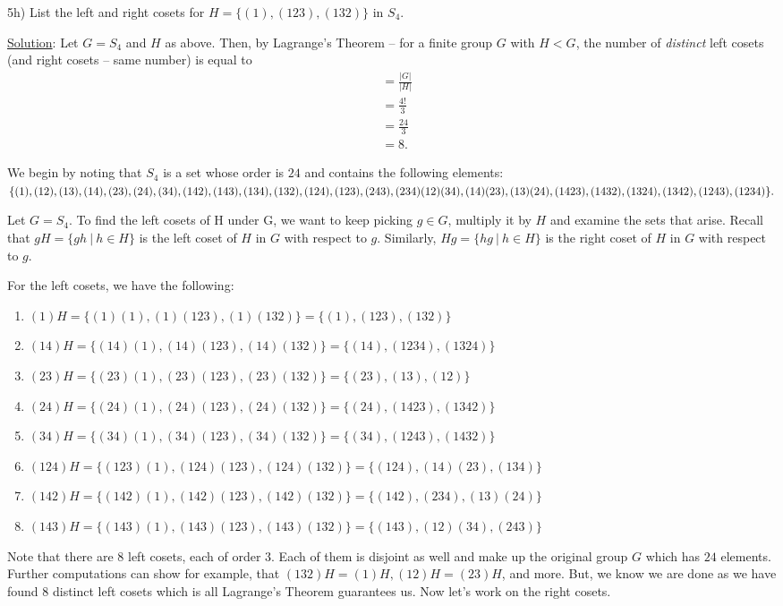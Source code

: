 \documentclass{article}
\begin{document}
5h) List the left and right cosets for $H = \{ (1), (123), (132) \}$ in $S_4$.

\underline{Solution}: Let $G = S_4$ and $H$ as above. Then, by Lagrange's Theorem -- for a finite group $G$ with $H < G$, the number of \textit{distinct} left cosets (and right cosets -- same number) is equal to
\begin{align*}
	[G:H] &= \frac{\lvert G \rvert}{\lvert H \rvert} \\
	&= \frac{4!}{3} \\
	&= \frac{24}{3} \\
	&= 8.
\end{align*}

We begin by noting that $S_4$ is a set whose order is $24$ and contains the following elements: \\
$\{ (1), (12), (13), (14), (23), (24), (34), \\
(142), (143),  (134), (132), (124), (123), (243), (234) \\
(12)(34), (14)(23), (13)(24), \\
(1423), (1432), (1324), (1342), (1243), (1234) \}.$

Let $G = S_4$. To find the left cosets of H under G, we want to keep picking $g \in G$, multiply it by $H$ and examine the sets that arise. Recall that $gH = \{gh \ \vert \ h \in H \}$ is the left coset of $H$ in $G$ with respect to $g$. Similarly, $Hg = \{ hg \ \vert \ h \in H \}$ is the right coset of $H$ in $G$ with respect to $g$. 

For the left cosets, we have the following:
\begin{enumerate}
   \item $(1)H = \{(1)(1), (1)(123), (1)(132) \} = \{(1), (123), (132) \}$
   \item $(14)H = \{(14)(1), (14)(123), (14)(132)\} = \{(14), (1234), (1324) \}$
   \item $(23)H = \{(23)(1), (23)(123), (23)(132)\} = \{(23), (13), (12) \}$
   \item $(24)H = \{(24)(1), (24)(123), (24)(132)\} = \{(24), (1423), (1342) \}$
   \item $(34)H = \{(34)(1), (34)(123), (34)(132)\} = \{(34), (1243), (1432) \}$
   \item $(124)H = \{(123)(1), (124)(123), (124)(132)\} = \{(124), (14)(23), (134) \}$
   \item $(142)H = \{(142)(1), (142)(123), (142)(132)\} = \{(142), (234), (13)(24) \}$
   \item $(143)H = \{(143)(1), (143)(123), (143)(132)\} = \{(143), (12)(34), (243) \}$
\end{enumerate}
Note that there are $8$ left cosets, each of order $3$. Each of them is disjoint as well and make up the original group $G$ which has $24$ elements. Further computations can show for example, that $(132)H = (1)H, (12)H = (23)H$, and more. But, we know we are done as we have found $8$ distinct left cosets which is all Lagrange's Theorem guarantees us. Now let's work on the right cosets. \pagebreak
\end{document}
